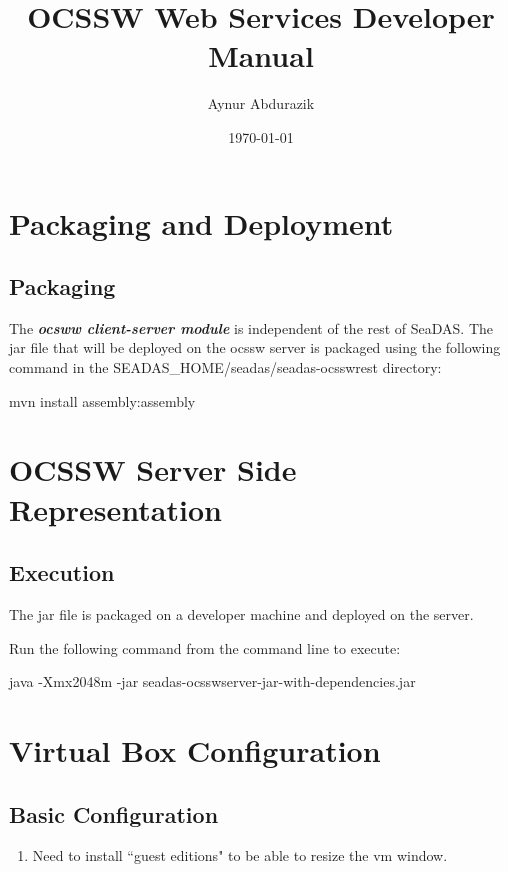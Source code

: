 \documentclass[11pt, oneside]{article}   	%
\title{OCSSW Web Services Developer Manual}
\author{Aynur Abdurazik}
\date{\today}							%
\begin{document}
\maketitle

\section{Packaging and Deployment}
\subsection{Packaging}

The \emph{\textbf{ocsww client-server module}}  is independent of the rest of SeaDAS. The jar file that will be deployed on the ocssw server is packaged using the following command in the \textdollar SEADAS\_HOME/seadas/seadas-ocsswrest directory:

\begin{code}
mvn install assembly:assembly
\end{code}

\section{\color{DarkOrange}OCSSW Server Side Representation}

\subsection{\color{DarkBlue} Execution}

The jar file is packaged on a developer machine and deployed on the server.

Run the following command from the command line to execute:
\begin{code}
﻿java -Xmx2048m -jar seadas-ocsswserver-jar-with-dependencies.jar
\end{code}


\section{\color{DarkGreen}Virtual Box Configuration}

\subsection{Basic Configuration}
\begin{enumerate}
\item Need to install ``guest editions" to be able to resize the vm window.
\end{enumerate}
\end{document}
